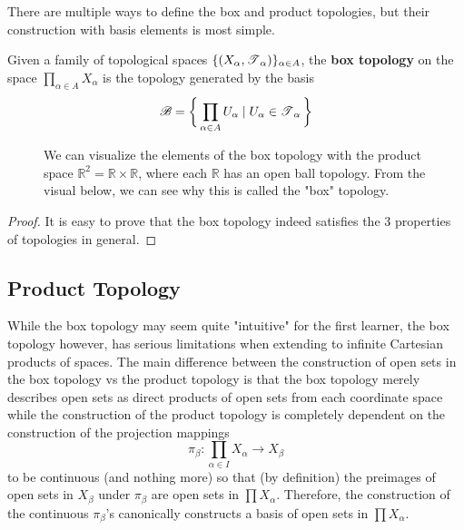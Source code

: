   There are multiple ways to define the box and product topologies, but their construction with basis elements is most simple. 

  \begin{definition}
    Given a family of topological spaces $\{(X_\alpha, \operatorname{\mathscr{T}}_\alpha)\}_{\alpha \in A}$, the \textbf{box topology} on the space $\prod_{\alpha \in A} X_\alpha$ is the topology generated by the basis 
    \begin{equation}
      \mathscr{B} = \bigg\{ \prod_{\alpha \in A} U_\alpha \mid U_\alpha \in \operatorname{\mathscr{T}}_\alpha \bigg\}
    \end{equation}

    \begin{figure}[H]
      \centering 
      \caption{We can visualize the elements of the box topology with the product space $\mathbb{R}^2 = \mathbb{R} \times \mathbb{R}$, where each $\mathbb{R}$ has an open ball topology. From the visual below, we can see why this is called the "box" topology. }
      \label{fig:box_topology}
    \end{figure}
  \end{definition}
  \begin{proof}
    It is easy to prove that the box topology indeed satisfies the 3 properties of topologies in general. 
  \end{proof}

\subsection{Product Topology}

  While the box topology may seem quite "intuitive" for the first learner, the box topology however, has serious limitations when extending to infinite Cartesian products of spaces. The main difference between the construction of open sets in the box topology vs the product topology is that the box topology merely describes open sets as direct products of open sets from each coordinate space while the construction of the product topology is completely dependent on the construction of the projection mappings 
  \begin{equation}
    \pi_\beta: \prod_{\alpha \in I} X_\alpha \rightarrow X_\beta
  \end{equation}
  to be continuous (and nothing more) so that (by definition) the preimages of open sets in $X_\beta$ under $\pi_\beta$ are open sets in $\prod X_\alpha$. Therefore, the construction of the continuous $\pi_\beta$'s canonically constructs a basis of open sets in $\prod X_\alpha$. 

